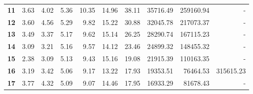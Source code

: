 \begin{table}[h]
\begin{center}
{\begin{tabular}{crrrrrrrrr}
\textbf{11}                        & 3.63                           & 4.02                           & 5.36                           & 10.35                           & 14.96                           & 38.11                           & 35716.49                       & 259160.94                        & -                                \\
\textbf{12}                        & 3.60                           & 4.56                           & 5.29                           & 9.82                           & 15.22                           & 30.88                           & 32045.78                       & 217073.37                        & -                                \\
\textbf{13}                        & 3.49                           & 3.37                           & 5.17                           & 9.62                            & 15.14                           & 26.25                           & 28290.74                        & 167115.23                        & -                                \\
\textbf{14}                        & 3.09                           & 3.21                           & 5.16                           & 9.57                           & 14.12                           & 23.46                           & 24899.32                        & 148455.32                        & -                                \\
\textbf{15}                        & 2.38                           & 3.09                           & 5.13                           & 9.43                           & 15.16                           & 19.08                           & 21915.39                        & 110163.35                        & -                                \\
\textbf{16}                        & 3.19                           & 3.42                           & 5.06                           & 9.17                           & 13.22                           & 17.93                           & 19353.51                        & 76464.53                         & 315615.23                     \\
\textbf{17}                        & 3.77                           & 4.32                           & 5.09                           & 9.07                           & 14.46                           & 17.95                           & 16933.29                        & 81678.43                         & -                                \\

\end{tabular}}
\end{center}
\end{table}
